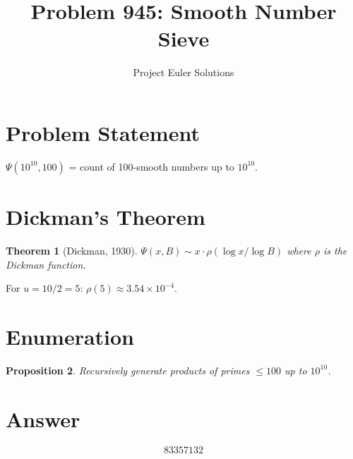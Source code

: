 \documentclass[11pt]{article}
\title{Problem 945: Smooth Number Sieve}
\author{Project Euler Solutions}
\date{}
\newtheorem{theorem}{Theorem}
\newtheorem{proposition}[theorem]{Proposition}
\theoremstyle{definition}
\begin{document}
\maketitle

\section{Problem Statement}
$\Psi(10^{10}, 100)$ = count of 100-smooth numbers up to $10^{10}$.

\section{Dickman's Theorem}
\begin{theorem}[Dickman, 1930]
$\Psi(x,B) \sim x \cdot \rho(\log x / \log B)$ where $\rho$ is the Dickman function.
\end{theorem}

For $u = 10/2 = 5$: $\rho(5) \approx 3.54 \times 10^{-4}$.

\section{Enumeration}
\begin{proposition}
Recursively generate products of primes $\leq 100$ up to $10^{10}$.
\end{proposition}

\section{Answer}

\[
\boxed{83357132}
\]
\end{document}
